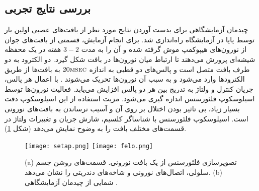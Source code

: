 \subsection{بررسی نتایج تجربی}
چیدمان آزمایشگاهی برای بدست آوردن نتایج مورد نظر از بافت‌های عصبی اولین بار توسط پاپا در آزمایشگاه راه‌اندازی شد\cite{papa}. برای انجام آزمایش، قسمتی از بافت‌های جوان از نورون‌های هیپوکمپ موش گرفته شده و آن را به مدت $3 - 2$ هفته در یک محفظه شیشه‌ای پرورش می‌دهند تا ارتباط میان نورون‌ها در بافت شکل گیرد. دو الکترود  به دو طرف بافت متصل است و پالس‌های دو قطبی به اندازه 
$20 \textsc{msec}$
 به بافت‌ها از طریق الکترود‌ها وارد می‌شود و به سبب آن نورون‌ها تحریک می‌شوند \cite{sorian}.
با اعمال هر پالس، جریان کنترل و ولتاژ به تدریج بین هر دو پالس افزایش می‌یابد. فعالیت نورون‌ها توسط اسیلوسکوپ فلئورسنس اندازه گیری می‌شود. مزیت استفاده از این اسیلوسکوپ دقت بسیار زیاد، بی تاثیر بودن اختلال بر روی آن و آسیب نرساندن به بافت‌های نورونی‌ است. اسیلوسکوپ فلئورسنس با شناساگر کلسیم،‌ شارش جریان و تغییرات ولتاژ در قسمت‌های مختلف بافت را به وضوح نمایش می‌دهد (شکل \ref{fig:setop}). 
\begin{figure}[htbp]
\hspace*{0cm}
\centering
\texttt{[image: setap.png]}
\texttt{[image: felo.png]}    
\caption[تصویرسازی فلئورسنس از یک بافت نورونی و شمایی از چیدمان آزمایشگاهی] {\footnotesize (a) تصویرسازی فلئورسنس از یک بافت نورونی. قسمت‌های روشن جسم سلولی، اتصال‌های نورونی و شاخه‌های دندریتی را نشان می‌دهد. (b) شمایی از چیدمان آزمایشگاهی \cite{sorian}.}
\label{fig:setop}
\end{figure}

